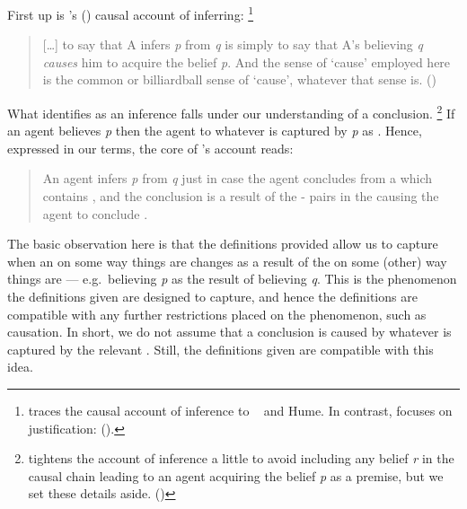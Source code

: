 \begin{note}
  First up is \citeauthor{Armstrong:1968vh}'s (\citeyear{Armstrong:1968vh}) causal account of inferring:%
  \footnote{
    \citeauthor{Armstrong:1968vh} traces the causal account of inference to ~\citeauthor{Moore:1962up} and Hume.
    In contrast, \citeauthor{Frege:1979aa} focuses on justification:  (\citeyear{Frege:1979aa}).
  }
  \begin{quote}
    [\dots] to say that A infers \emph{p} from \emph{q} is simply to say that A's believing \emph{q} \emph{causes} him to acquire the belief \emph{p}.
    And the sense of `cause' employed here is the common or billiardball sense of `cause', whatever that sense is.\newline
    \mbox{}\hfill\mbox{(\citeyear[194]{Armstrong:1968vh})}
  \end{quote}
  What \citeauthor{Armstrong:1968vh} identifies as an inference falls under our understanding of a conclusion.%
  \footnote{
    \citeauthor{Armstrong:1968vh} tightens the account of inference a little to avoid including any belief \emph{r} in the causal chain leading to an agent acquiring the belief \emph{p} as a premise, but we set these details aside.
    (\citeyear[195--197]{Armstrong:1968vh})
  }
  If an agent believes \emph{p} then the agent to \eval{} whatever  is captured by \emph{p} as .
  Hence, expressed in our terms, the core of \citeauthor{Armstrong:1968vh}'s account reads:
  \begin{quote}
    An agent infers \emph{p} from \emph{q} just in case the agent concludes  from a \pool{} which contains , and the conclusion is a result of the - pairs in the \pool{} causing the agent to conclude .
  \end{quote}
  The basic observation here is that the definitions provided allow us to capture when an \agpe{} on some way things are changes as a result of the \agpe{} on some (other) way things are --- e.g.\ believing \emph{p} as the result of believing \emph{q}.
  This is the phenomenon the definitions given are designed to capture, and hence the definitions are compatible with any further restrictions placed on the phenomenon, such as causation.
  In short, we do not assume that a conclusion is caused by whatever is captured by the relevant .
  Still, the definitions given are compatible with this idea.
\end{note}


